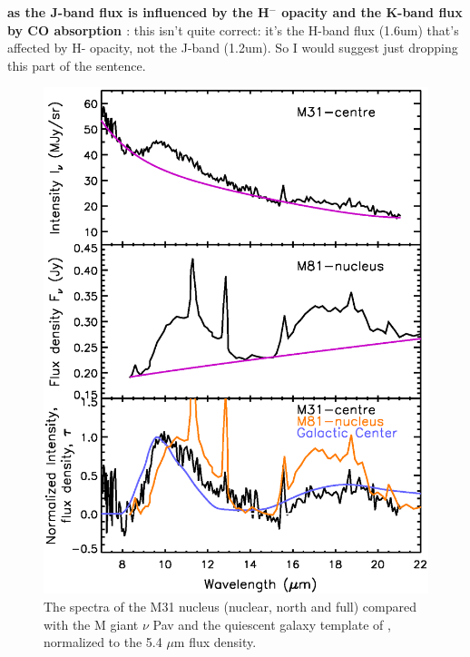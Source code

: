 {\bf as the J-band flux is influenced by the H$^-$ opacity and the K-band flux by CO absorption \citep{Sorba:10}}: this isn't quite correct: it's the H-band
flux (1.6um)  that's affected by H- opacity, not the J-band (1.2um). So I would suggest just dropping this part of the sentence.

\begin{figure}
\centering
\includegraphics[width = 8 cm]{./fig12.eps}
\caption{The spectra of the M31 nucleus (nuclear, north and full) compared with the M giant $\nu$ Pav and the quiescent galaxy template of \citet{Kaneda:08}, normalized to the 5.4 $\mu$m flux density.}
\label{fig:nuc_stellar}
\end{figure}

